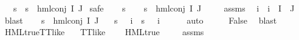 \begin{isabellebody}
\ \ \ {\isachardoublequoteopen}{\isasymforall}s{\isachardot}{\kern0pt}\ {\isasymnot}\ {\isacharparenleft}{\kern0pt}s\ {\isasymTurnstile}\ {\isacharparenleft}{\kern0pt}hml{\isacharunderscore}{\kern0pt}conj\ I\ J\ {\isasymPhi}{\isacharparenright}{\kern0pt}{\isacharparenright}{\kern0pt}{\isachardoublequoteclose}\isanewline
%
\isadelimproof
%
\endisadelimproof
%
\isatagproof
{}\isamarkupfalse%
{\isacharparenleft}{\kern0pt}safe{\isacharparenright}{\kern0pt}\isanewline
\ \ \isamarkupfalse%
\ s\isanewline
\ \ \isamarkupfalse%
\ {\isachardoublequoteopen}s\ {\isasymTurnstile}\ hml{\isacharunderscore}{\kern0pt}conj\ I\ J\ {\isasymPhi}{\isachardoublequoteclose}\isanewline
\ \ \isamarkupfalse%
\ assms\ \isamarkupfalse%
\ i\ \ {\isachardoublequoteopen}i\ {\isasymin}\ I\ {\isasyminter}\ J{\isachardoublequoteclose}\ \isamarkupfalse%
\ blast\isanewline
\ \ \isamarkupfalse%
\ {\isacartoucheopen}s\ {\isasymTurnstile}\ hml{\isacharunderscore}{\kern0pt}conj\ I\ J\ {\isasymPhi}{\isacartoucheclose}\ \isamarkupfalse%
\ {\isachardoublequoteopen}{\isacharparenleft}{\kern0pt}{\isacharparenleft}{\kern0pt}s\ {\isasymTurnstile}\ {\isacharparenleft}{\kern0pt}{\isasymPhi}\ i{\isacharparenright}{\kern0pt}{\isacharparenright}{\kern0pt}\ {\isasymand}\ {\isacharparenleft}{\kern0pt}{\isasymnot}{\isacharparenleft}{\kern0pt}s\ {\isasymTurnstile}\ {\isacharparenleft}{\kern0pt}{\isasymPhi}\ i{\isacharparenright}{\kern0pt}{\isacharparenright}{\kern0pt}{\isacharparenright}{\kern0pt}{\isacharparenright}{\kern0pt}{\isachardoublequoteclose}\isanewline
\ \ \ \ \isamarkupfalse%
\ auto\isanewline
\ \ \isamarkupfalse%
\ \isamarkupfalse%
\ False\ \isamarkupfalse%
\ blast\isanewline
{}\isamarkupfalse%
%
\endisatagproof
{\isafoldproof}%
%
\isadelimproof
\isanewline
%
\endisadelimproof
\isanewline
{}\isamarkupfalse%
\ HML{\isacharunderscore}{\kern0pt}true{\isacharunderscore}{\kern0pt}TT{\isacharunderscore}{\kern0pt}like{\isacharcolon}{\kern0pt}\isanewline
\ \ \ {\isachardoublequoteopen}TT{\isacharunderscore}{\kern0pt}like\ {\isasymphi}{\isachardoublequoteclose}\isanewline
\ \ \ {\isachardoublequoteopen}HML{\isacharunderscore}{\kern0pt}true\ {\isasymphi}{\isachardoublequoteclose}\isanewline
%
\isadelimproof
\ \ %
\endisadelimproof
%
\isatagproof
{}\isamarkupfalse%
\ assms\isanewline
\ \ \isamarkupfalse%

\end{isabellebody}
